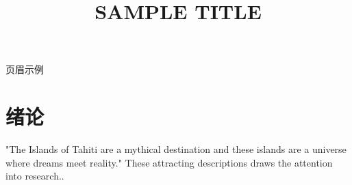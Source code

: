\documentclass[12pt,journal,onecolumn]{IEEEtran}
\begin{document}
\title{\textbf{SAMPLE TITLE}}





{页眉示例} %
\maketitle



\patchcmd{\section}{\centering}{\raggedright}{}{} %
\patchcmd{\section}{\normalsize}{\large\bfseries}{}{} %

\section{绪论}

"The Islands of Tahiti are a mythical destination and these islands are a universe where dreams meet reality." These attracting descriptions draws the attention into research.\cite{populationref}.
\end{document}
